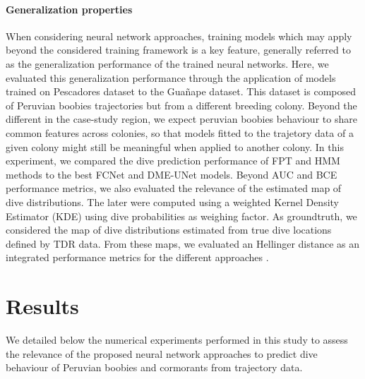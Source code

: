 \documentclass{article}
\begin{document}
\paragraph{Generalization properties}
When considering neural network approaches, training models which may apply beyond the considered training framework is a key feature, generally referred to as the generalization performance of the trained neural networks. Here, we evaluated this generalization performance through the application of models trained on Pescadores dataset to the Gua\~nape dataset.
This dataset is composed of Peruvian boobies trajectories but from a different breeding colony. Beyond the different in the case-study region, we expect peruvian boobies behaviour to share common features across colonies, so that models fitted to the trajetory data of a given colony might still be meaningful when applied to another colony.
In this experiment, we compared the dive prediction performance of FPT and HMM methods to the best FCNet and DME-UNet models. Beyond AUC and BCE performance metrics, we also evaluated the relevance of the estimated map of dive distributions. The later were computed using a weighted Kernel Density Estimator (KDE) using dive probabilities as weighing factor. As groundtruth, we considered the map of dive distributions estimated from true dive locations defined by TDR data. From these maps, we evaluated an Hellinger distance as an integrated performance metrics for the different approaches \cite{wilson_distancebased_2011}.

\section{Results}

We detailed below the numerical experiments performed in this study to assess the relevance of the proposed neural network approaches to predict dive behaviour of Peruvian boobies and cormorants from trajectory data.
\end{document}

